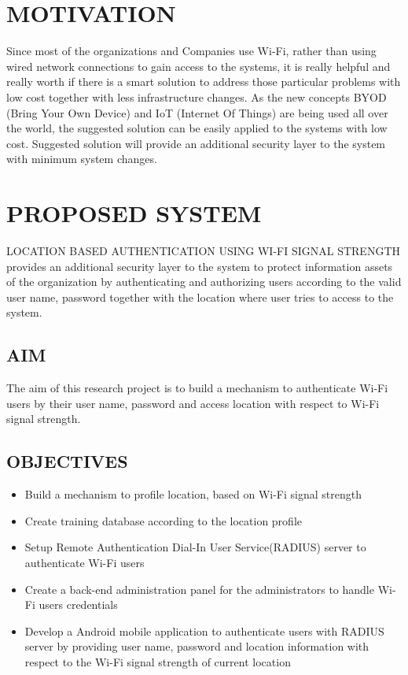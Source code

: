 \section{MOTIVATION}
Since most of the organizations and Companies use Wi-Fi, rather than using wired network connections to gain access to the systems, it is really helpful and really worth if there is a smart solution to address those particular problems with low cost together with less infrastructure changes.
As the new concepts BYOD (Bring Your Own Device) and IoT (Internet Of  Things) are being used all over the world, the suggested solution can be easily applied to the systems with low cost. Suggested solution will provide an additional security layer to the system with minimum system changes.

\section{PROPOSED SYSTEM}
LOCATION BASED AUTHENTICATION USING WI-FI SIGNAL STRENGTH provides an additional security layer to the system to protect information assets of the organization by authenticating and authorizing users according to the valid user name, password together with the location where user tries to access to the system.
\subsection{AIM}
The aim of this research project is to build a mechanism to authenticate Wi-Fi users by their user name, password and access location with respect to Wi-Fi signal strength.

\subsection{OBJECTIVES}
\begin{itemize}
	\item Build a mechanism to profile location, based on Wi-Fi signal strength
	\item Create training database according to the location profile
	\item Setup Remote Authentication Dial-In User Service(RADIUS) server to authenticate Wi-Fi users
	\item Create a back-end administration panel for the administrators to handle Wi-Fi users credentials 
	\item Develop a Android mobile application to authenticate users with RADIUS server by providing user name, password and location information with respect to the Wi-Fi signal strength of current location
\end{itemize}

